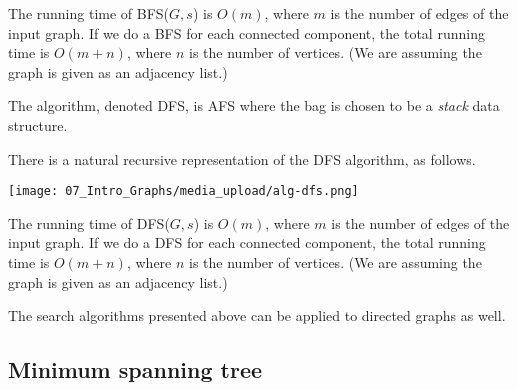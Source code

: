 \begin{note}
\label{note:Running-time-of-BFS} 
The running time of BFS($G,s$) is $O(m)$, where $m$ is the number of edges of the input graph. If we do a BFS for each connected component, the total running time is $O(m+n)$, where $n$ is the number of vertices. (We are assuming the graph is given as an adjacency list.)

\end{note}

\begin{definition}
\label{definition:Depth-first-search-DFS-algorithm} 
The  algorithm, denoted DFS, is AFS where the bag is chosen to be a \emph{stack} data structure. 

\end{definition}

\begin{note}
\label{note:Recursive-DFS}
There is a natural recursive representation of the DFS algorithm, as follows.
\begin{center}
    \texttt{[image: 07\_Intro\_Graphs/media\_upload/alg-dfs.png]}
\end{center}

\end{note}

\begin{note}
\label{note:Running-time-of-DFS}
The running time of DFS($G,s$) is $O(m)$, where $m$ is the number of edges of the input graph. If we do a DFS for each connected component, the total running time is $O(m+n)$, where $n$ is the number of vertices. (We are assuming the graph is given as an adjacency list.)

\end{note}

\begin{note}
\label{note:Search-algorithms-on-directed-graphs}
The search algorithms presented above can be applied to directed graphs as well.

\end{note}


\subsection{Minimum spanning tree}
\label{sec:intro-to-graph-theory::minimum-spanning-tree}

